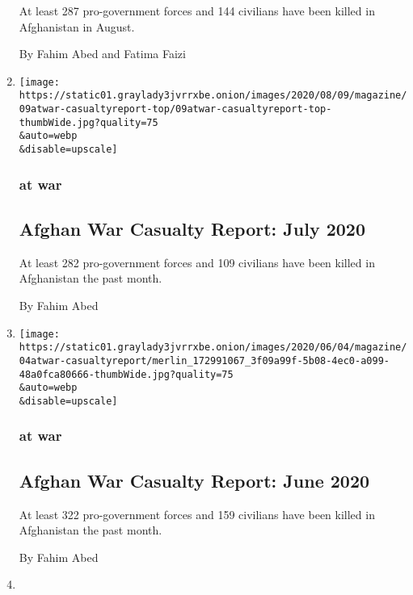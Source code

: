 \begin{enumerate}
  At least 287 pro-government forces and 144 civilians have been killed
  in Afghanistan in August.

  By Fahim Abed and Fatima Faizi
\item
  \href{/2020/07/09/magazine/afghan-war-casualty-report-july-2020.html}{}

  \texttt{[image: https://static01.graylady3jvrrxbe.onion/images/2020/08/09/magazine/09atwar-casualtyreport-top/09atwar-casualtyreport-top-thumbWide.jpg?quality=75\\\&auto=webp\\\&disable=upscale]}

  \hypertarget{at-war-2}{%
  \subsubsection{at war}\label{at-war-2}}

  \hypertarget{afghan-war-casualty-report-july-2020}{%
  \subsection{Afghan War Casualty Report: July
  2020}\label{afghan-war-casualty-report-july-2020}}

  At least 282 pro-government forces and 109 civilians have been killed
  in Afghanistan the past month.

  By Fahim Abed
\item
  \href{/2020/06/04/magazine/afghan-war-casualty-report-june-2020.html}{}

  \texttt{[image: https://static01.graylady3jvrrxbe.onion/images/2020/06/04/magazine/04atwar-casualtyreport/merlin\_172991067\_3f09a99f-5b08-4ec0-a099-48a0fca80666-thumbWide.jpg?quality=75\\\&auto=webp\\\&disable=upscale]}

  \hypertarget{at-war-3}{%
  \subsubsection{at war}\label{at-war-3}}

  \hypertarget{afghan-war-casualty-report-june-2020}{%
  \subsection{Afghan War Casualty Report: June
  2020}\label{afghan-war-casualty-report-june-2020}}

  At least 322 pro-government forces and 159 civilians have been killed
  in Afghanistan the past month.

  By Fahim Abed
\item
  \href{/2020/05/07/magazine/afghan-war-casualty-report-may-2020.html}{}


\end{enumerate}
